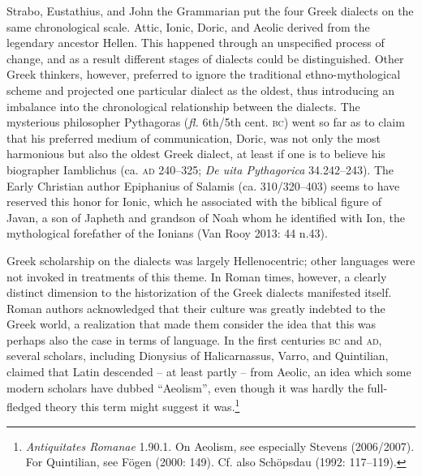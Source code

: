 \begin{styleStandard}
Strabo, Eustathius, and John the Grammarian put the four Greek dialects on the same chronological scale. Attic, Ionic, Doric, and Aeolic derived from the legendary ancestor Hellen. This happened through an unspecified process of change, and as a result different stages of dialects could be distinguished. Other Greek thinkers, however, preferred to ignore the traditional ethno-mythological scheme and projected one particular dialect as the oldest, thus introducing an imbalance into the chronological relationship between the dialects. The mysterious philosopher Pythagoras (\textit{fl.} 6th/5th cent. \textsc{bc}) went so far as to claim that his preferred medium of communication, Doric, was not only the most harmonious but also the oldest Greek dialect, at least if one is to believe his biographer Iamblichus (ca. \textsc{ad} 240–325; \textit{De uita Pythagorica} 34.242–243). The Early Christian author Epiphanius of Salamis (ca. 310/320–403) seems to have reserved this honor for Ionic, which he associated with the biblical figure of Javan, a son of Japheth and grandson of Noah whom he identified with Ion, the mythological forefather of the Ionians (Van Rooy 2013: 44 n.43).
\end{styleStandard}

\begin{styleStandard}
Greek scholarship on the dialects was largely Hellenocentric; other languages were not invoked in treatments of this theme. In Roman times, however, a clearly distinct dimension to the historization of the Greek dialects manifested itself. Roman authors acknowledged that their culture was greatly indebted to the Greek world, a realization that made them consider the idea that this was perhaps also the case in terms of language. In the first centuries \textsc{bc} and \textsc{ad}, several scholars, including Dionysius of Halicarnassus, Varro, and Quintilian, claimed that Latin descended – at least partly – from Aeolic, an idea which some modern scholars have dubbed “Aeolism”, even though it was hardly the full-fledged theory this term might suggest it was.\footnote{ \textit{Antiquitates Romanae} 1.90.1. On Aeolism, see especially Stevens (2006/2007). For Quintilian, see Fögen (2000: 149). Cf. also Schöpsdau (1992: 117–119).}
\end{styleStandard}

